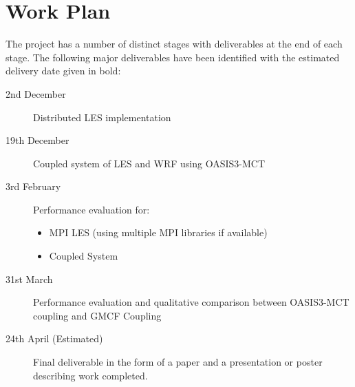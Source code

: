 \documentclass{acm_proc_article-sp}
\renewcommand{\_}{\underscore\hspace{0pt}}
\begin{document}
\section*{Work Plan}

The project has a number of distinct stages with deliverables at the end of each
stage. The following major deliverables have been identified with the estimated
delivery date given in bold:

\begin{description}
	\item[2nd December] Distributed LES implementation
	\item[19th December] Coupled system of LES and WRF using OASIS3-MCT
	\item[3rd February] Performance evaluation for:
    \begin{itemize}
        \item MPI LES (using multiple MPI libraries if available)
        \item Coupled System
    \end{itemize}
	\item[31st March] Performance evaluation and qualitative comparison between
    OASIS3-MCT coupling and GMCF Coupling
    \item[24th April (Estimated)] Final deliverable in the form of a paper and a
    presentation or poster describing work completed.
\end{description}



\end{document}
